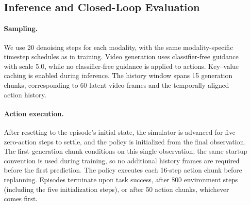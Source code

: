 \subsection{Inference and Closed-Loop Evaluation}
\label{sec:supp-evaluation}

\paragraph{Sampling.}
We use 20 denoising steps for each modality, with the same
modality-specific timestep schedules as in training. Video generation
uses classifier-free guidance with scale 5.0, while no classifier-free
guidance is applied to actions. Key--value caching is enabled during
inference. The history window spans 15 generation chunks, corresponding
to 60 latent video frames and the temporally aligned action history.

\paragraph{Action execution.}
After resetting to the episode's initial state, the simulator is advanced for
five zero-action steps to settle, and the policy is initialized from the final
observation. The first generation chunk conditions on this single observation;
the same startup convention is used during training, so no additional history
frames are required before the first prediction. The policy executes each
16-step action chunk before replanning. Episodes terminate upon task success,
after 800 environment steps (including the five initialization steps), or after
50 action chunks, whichever comes first.


